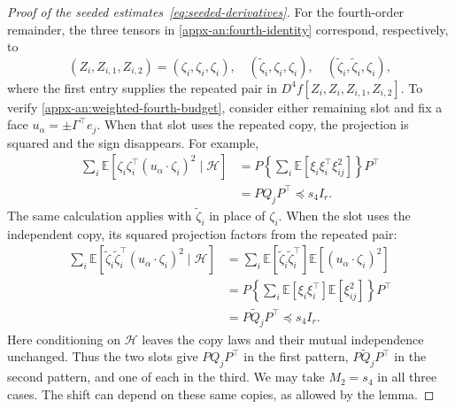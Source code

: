 \documentclass[11pt,letterpaper]{article}
\theoremstyle{remark}
\newcommand{\E}{\mathbb E}
\begin{document}
\begin{proof}[Proof of the seeded estimates~\eqref{eq:seeded-derivatives}]
For the fourth-order remainder, the three tensors in
\eqref{appx-an:fourth-identity} correspond, respectively, to
\[
 (Z_i,Z_{i,1},Z_{i,2})
 =(\zeta_i,\zeta_i,\zeta_i),\quad
  (\widetilde\zeta_i,\zeta_i,\zeta_i),\quad
  (\widetilde\zeta_i,\widetilde\zeta_i,\zeta_i),
\]
where the first entry supplies the repeated pair in
$D^4f[Z_i,Z_i,Z_{i,1},Z_{i,2}]$. To verify
\eqref{appx-an:weighted-fourth-budget}, consider either remaining
slot and fix a face $u_\alpha=\pm\Gamma^\top e_j$.
When that slot uses the repeated copy, the projection is squared
and the sign disappears. For example,
\[
 \begin{aligned}
 \sum_i\E[\zeta_i\zeta_i^\top
                  (u_\alpha\cdot\zeta_i)^2\mid\mathcal H]
 &=P\left\{\sum_i\E[\xi_i\xi_i^\top\xi_{ij}^2]\right\}P^\top\\
 &=PQ_jP^\top\preceq s_4I_r.
 \end{aligned}
\]
The same calculation applies with $\widetilde\zeta_i$ in place
of $\zeta_i$. When the slot uses the independent copy, its
squared projection factors from the repeated pair:
\[
 \begin{aligned}
 \sum_i\E[\widetilde\zeta_i\widetilde\zeta_i^\top
                  (u_\alpha\cdot\zeta_i)^2\mid\mathcal H]
 &=\sum_i\E[\widetilde\zeta_i\widetilde\zeta_i^\top]
                   \E[(u_\alpha\cdot\zeta_i)^2]\\
 &=P\left\{\sum_i\E[\xi_i\xi_i^\top]\E[\xi_{ij}^2]\right\}P^\top\\
 &=P\widetilde Q_jP^\top\preceq s_4I_r.
 \end{aligned}
\]
Here conditioning on $\mathcal H$ leaves the copy laws and
their mutual independence unchanged. Thus the two slots give
$PQ_jP^\top$ in the first pattern,
$P\widetilde Q_jP^\top$ in the second pattern, and one of each
in the third. We may take $M_2=s_4$ in all three cases. The
shift can depend on these same copies, as allowed by the lemma.


\end{proof}
\end{document}
